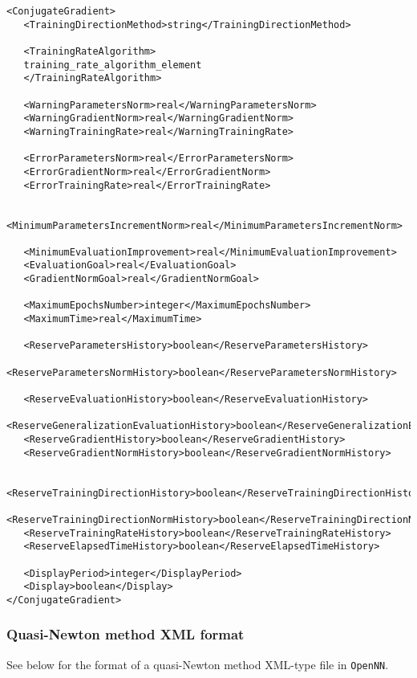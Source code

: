 \begin{lstlisting}
<ConjugateGradient>
   <TrainingDirectionMethod>string</TrainingDirectionMethod>
   
   <TrainingRateAlgorithm>
   training_rate_algorithm_element
   </TrainingRateAlgorithm>
      
   <WarningParametersNorm>real</WarningParametersNorm>
   <WarningGradientNorm>real</WarningGradientNorm>
   <WarningTrainingRate>real</WarningTrainingRate>
   
   <ErrorParametersNorm>real</ErrorParametersNorm>
   <ErrorGradientNorm>real</ErrorGradientNorm>
   <ErrorTrainingRate>real</ErrorTrainingRate>
   
   <MinimumParametersIncrementNorm>real</MinimumParametersIncrementNorm>
  
   <MinimumEvaluationImprovement>real</MinimumEvaluationImprovement> 
   <EvaluationGoal>real</EvaluationGoal>
   <GradientNormGoal>real</GradientNormGoal>
   
   <MaximumEpochsNumber>integer</MaximumEpochsNumber>
   <MaximumTime>real</MaximumTime>
   
   <ReserveParametersHistory>boolean</ReserveParametersHistory>
   <ReserveParametersNormHistory>boolean</ReserveParametersNormHistory>
   
   <ReserveEvaluationHistory>boolean</ReserveEvaluationHistory>
   <ReserveGeneralizationEvaluationHistory>boolean</ReserveGeneralizationEvaluationHistory>
   <ReserveGradientHistory>boolean</ReserveGradientHistory>
   <ReserveGradientNormHistory>boolean</ReserveGradientNormHistory>
   
   <ReserveTrainingDirectionHistory>boolean</ReserveTrainingDirectionHistory>
   <ReserveTrainingDirectionNormHistory>boolean</ReserveTrainingDirectionNormHistory>
   <ReserveTrainingRateHistory>boolean</ReserveTrainingRateHistory>
   <ReserveElapsedTimeHistory>boolean</ReserveElapsedTimeHistory>
   
   <DisplayPeriod>integer</DisplayPeriod>
   <Display>boolean</Display>
</ConjugateGradient>
\end{lstlisting}


\subsubsection*{Quasi-Newton method XML format}

See below for the format of a quasi-Newton method XML-type file in \texttt{OpenNN}.

